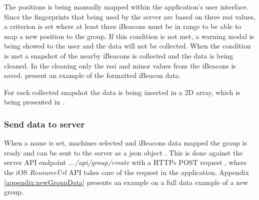 \bigskip

The positions is being manually mapped within the application's user interface.
Since the fingerprints that being used by the server are based on three \acrshort{rssi} values, a criterion is set where at least three iBeacons must be in range to be able to map a new position to the group.
If this condition is not met, a warning modal is being showed to the user and the data will not be collected.
When the condition is met a snapshot of the nearby iBeacons is collected and the data is being cleaned.
In the cleaning only the \acrshort{rssi} and minor values from the iBeacons is saved.
 present an example of the formatted iBeacon data.


For each collected snapshot the data is being inserted in a 2D array, which is being presented in .


\subsubsection{Send data to server}\label{sec:implAppnewGroupSend}
When a name is set, machines selected and iBeacons data mapped the group is ready and can be sent to the server as a \acrfull{json} object \cite{IntroducingJSON}.
This is done against the server API endpoint \textit{.../api/group/create} with a HTTPs POST request \cite{POSTHTTPMDN}, where the iOS \textit{ResourceUrl} API \cite{ResourceURLAppleDeveloper} takes care of the request in the application.
Appendix \ref{appendix:newGroupData} presents an example on a full data example of a new group.
